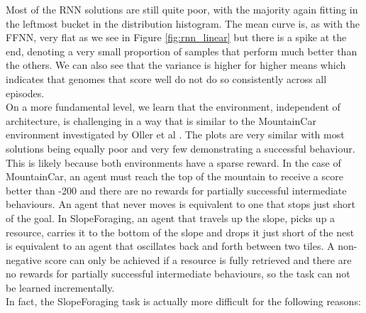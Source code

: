 \documentclass[12pt]{article}
\begin{document}
Most of the RNN solutions are still quite poor, with the majority again fitting in the leftmost bucket in the distribution histogram. The mean curve is, as with the FFNN, very flat as we see in Figure \ref{fig:rnn_linear} but there is a spike at the end, denoting a very small proportion of samples that perform much better than the others. We can also see that the variance is higher for higher means which indicates that genomes that score well do not do so consistently across all episodes.\\

On a more fundamental level, we learn that the environment, independent of architecture, is challenging in a way that is similar to the MountainCar \cite{MountainCar} environment investigated by Oller et al \cite{oller:AAMAS:2020}. The plots are very similar with most solutions being equally poor and very few demonstrating a successful behaviour. This is likely because both environments have a sparse reward. In the case of MountainCar, an agent must reach the top of the mountain to receive a score better than -200 and there are no rewards for partially successful intermediate behaviours. An agent that never moves is equivalent to one that stops just short of the goal. In SlopeForaging, an agent that travels up the slope, picks up a resource, carries it to the bottom of the slope and drops it just short of the nest is equivalent to an agent that oscillates back and forth between two tiles. A non-negative score can only be achieved if a resource is fully retrieved and there are no rewards for partially successful intermediate behaviours, so the task can not be learned incrementally.\\

In fact, the SlopeForaging task is actually more difficult for the following reasons:
\end{document}
